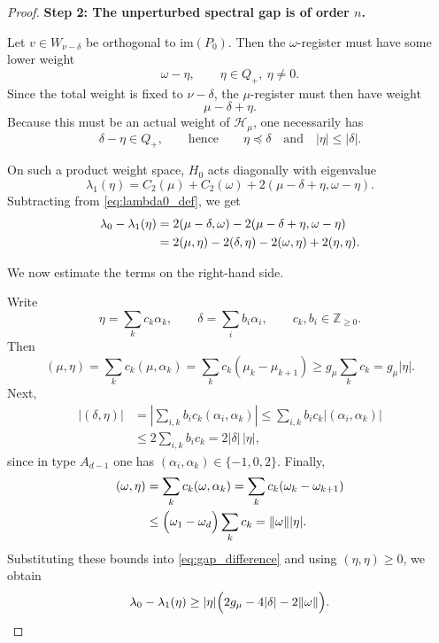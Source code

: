 \documentclass[a4paper,onecolumn,11pt]{quantumarticle}
\begin{document}
\begin{proof}
\medskip
\noindent\textbf{Step 2: The unperturbed spectral gap is of order \(n\).}

Let \(v\in W_{\nu-\delta}\) be orthogonal to \(\mathrm{im}(P_0)\). Then the \(\omega\)-register must have some lower weight
\[
\omega-\eta,
\qquad
\eta\in Q_+,\ \eta\neq 0.
\]
Since the total weight is fixed to \(\nu-\delta\), the \(\mu\)-register must then have weight
\[
\mu-\delta+\eta.
\]
Because this must be an actual weight of \(\mathcal H_\mu\), one necessarily has
\[
\delta-\eta\in Q_+,
\qquad\text{hence}\qquad
\eta\preceq \delta
\quad\text{and}\quad
|\eta|\le |\delta|.
\]

On such a product weight space, \(H_0\) acts diagonally with eigenvalue
\begin{equation}
    \lambda_1(\eta)
    =
    C_2(\mu)+C_2(\omega)+2(\mu-\delta+\eta,\omega-\eta).
\end{equation}
Subtracting from \eqref{eq:lambda0_def}, we get
\begin{align}
    \lambda_0-\lambda_1(\eta)
    &=
    2(\mu-\delta,\omega)-2(\mu-\delta+\eta,\omega-\eta)\notag\\
    &=
    2(\mu,\eta)-2(\delta,\eta)-2(\omega,\eta)+2(\eta,\eta).
    \label{eq:gap_difference}
\end{align}

We now estimate the terms on the right-hand side.

Write
\[
\eta=\sum_k c_k\alpha_k,
\qquad
\delta=\sum_i b_i\alpha_i,
\qquad
c_k,b_i\in\mathbb Z_{\ge 0}.
\]
Then
\begin{equation}
    (\mu,\eta)
    =
    \sum_k c_k(\mu,\alpha_k)
    =
    \sum_k c_k(\mu_k-\mu_{k+1})
    \ge
    g_\mu \sum_k c_k
    =
    g_\mu |\eta|.
\end{equation}
Next,
\begin{equation}
\begin{aligned}
    |(\delta,\eta)|
    &=
    \left|
    \sum_{i,k} b_i c_k (\alpha_i,\alpha_k)
    \right|
    \le
    \sum_{i,k} b_i c_k |(\alpha_i,\alpha_k)| \\
    &\le
    2\sum_{i,k} b_i c_k
    =
    2|\delta|\,|\eta|,
\end{aligned}
\end{equation}
since in type \(A_{d-1}\) one has \((\alpha_i,\alpha_k)\in\{-1,0,2\}\).
Finally,
\begin{equation}
\begin{aligned}
    (\omega,\eta)
    &=\sum_k c_k(\omega,\alpha_k)
    =\sum_k c_k(\omega_k-\omega_{k+1}) \\
    &\le \Bigl(\omega_1-\omega_d\Bigr)\sum_k c_k
    = \|\omega\| |\eta|.
\end{aligned}
\end{equation}
Substituting these bounds into \eqref{eq:gap_difference} and using \((\eta,\eta)\ge 0\), we obtain
\begin{equation}\label{eq:gap_lower_bound_intermediate}
    \lambda_0-\lambda_1(\eta)
    \ge
    |\eta|\Bigl(2g_\mu-4|\delta|-2\|\omega\|\Bigr).
\end{equation}


\end{proof}
\end{document}
